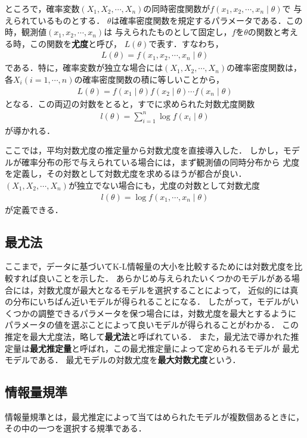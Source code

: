 ところで，確率変数$(X_1, X_2, \cdots, X_n)$の同時密度関数が$f(x_1, x_2, \cdots, x_n \mid \theta)$で
与えられているものとする．
$\theta$は確率密度関数を規定するパラメータである．この時，観測値$(x_1, x_2, \cdots, x_n)$は
与えられたものとして固定し，$f$を$\theta$の関数と考える時，この関数を\textbf{尤度}と呼び，
$L(\theta)$で表す．すなわち，
\begin{align*}
  L(\theta) = f(x_1, x_2, \cdots, x_n \mid \theta)
\end{align*}
である．特に，確率変数が独立な場合には$(X_1, X_2, \cdots, X_n)$の確率密度関数は，
各$X_i (i = 1, \cdots, n)$の確率密度関数の積に等しいことから，
\begin{align*}
  L(\theta) = f(x_1 \mid \theta)f(x_2 \mid \theta) \cdots f(x_n \mid \theta)
\end{align*}
となる．この両辺の対数をとると，すでに求められた対数尤度関数
\begin{align*}
  l(\theta) = \sum_{i=1}^{n}\log f(x_i \mid \theta)
\end{align*}
が導かれる．

ここでは，平均対数尤度の推定量から対数尤度を直接導入した．
しかし，モデルが確率分布の形で与えられている場合には，まず観測値の同時分布から
尤度を定義し，その対数として対数尤度を求めるほうが都合が良い．
$(X_1, X_2, \cdots, X_n)$が独立でない場合にも，尤度の対数として対数尤度
\begin{align*}
  l(\theta) = \log f(x_1, \cdots, x_n \mid \theta)
\end{align*}
が定義できる．

\subsection{最尤法}
ここまで，データに基づいてK-L情報量の大小を比較するためには対数尤度を比較すれば良いことを示した．
あらかじめ与えられたいくつかのモデルがある場合には，対数尤度が最大となるモデルを選択することによって，
近似的には真の分布にいちばん近いモデルが得られることになる．
したがって，モデルがいくつかの調整できるパラメータを保つ場合には，対数尤度を最大とするように
パラメータの値を選ぶことによって良いモデルが得られることがわかる．
この推定を最大尤度法，略して\textbf{最尤法}と呼ばれている．
また，最尤法で導かれた推定量は\textbf{最尤推定量}と呼ばれ，この最尤推定量によって定められるモデルが
最尤モデルである．
最尤モデルの対数尤度を\textbf{最大対数尤度}という．

\subsection{情報量規準}
情報量規準とは，最尤推定によって当てはめられたモデルが複数個あるときに，その中の一つを選択する規準である．


